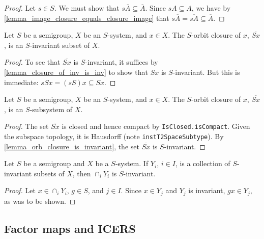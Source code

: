 \begin{proof}
\leanok{}
    Let $s \in S$.  We must show that $s \overline{A} \subseteq \overline{A}$.  Since $s A \subseteq A$, we have by \cref{lemma_image_closure_equals_closure_image} that $s \overline{A} = \overline{sA} \subseteq \overline{A}$.
\end{proof}

\begin{lemma}
    \label{lemma_orb_closure_is_invariant}
    \leanok{}
    Let $S$ be a semigroup, $X$ be an $S$-system, and $x \in X$.  The $S$-orbit closure of $x$, $\overline{Sx}$, is an $S$-invariant subset of $X$.
\end{lemma}

\begin{proof}
\leanok{}
    To see that $\overline{Sx}$ is $S$-invariant, it suffices by \cref{lemma_closure_of_inv_is_inv} to show that $Sx$ is $S$-invariant.  But this is immediate: $sSx = (sS)x \subseteq Sx$.
\end{proof}

\begin{lemma}
    \label{lemma_orb_closure_is_subsystem}
    \leanok{}
    Let $S$ be a semigroup, $X$ be an $S$-system, and $x \in X$.  The $S$-orbit closure of $x$, $\overline{Sx}$, is an $S$-subsystem of $X$.
\end{lemma}

\begin{proof}
    \leanok{}
    The set $\overline{Sx}$ is closed and hence compact by \verb|IsClosed.isCompact|.  Given the subspace topology, it is Hausdorff (note \verb|instT2SpaceSubtype|). By \cref{lemma_orb_closure_is_invariant}, the set $\overline{Sx}$ is $S$-invariant.
\end{proof}

\begin{lemma}
    \label{lemma_intersection_of_invariant}
    \leanok{}
    Let $S$ be a semigroup and $X$ be a $S$-system.  If $Y_i$, $i \in I$, is a collection of $S$-invariant subsets of $X$, then $\cap_i Y_i$ is $S$-invariant.
\end{lemma}

\begin{proof}
\leanok{}
    Let $x \in \cap_i Y_i$, $g \in S$, and $j \in I$.  Since $x \in Y_j$ and $Y_j$ is invariant, $gx \in Y_j$, as was to be shown.
\end{proof}

\subsection{Factor maps and ICERS}

